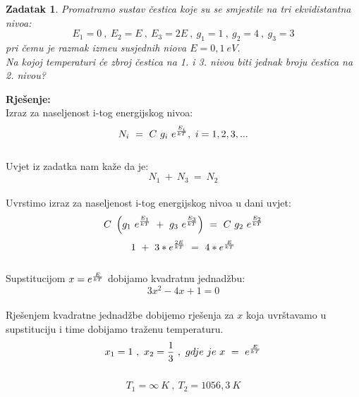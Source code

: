 \documentclass[a4paper,12pt]{article}
\newtheorem{ZDK}{Zadatak}[section]
\begin{document}
\newpage
\begin{ZDK}
	Promatramo sustav \v{c}estica koje su se smjestile na tri ekvidistantna nivoa:
	$$ E_1=0\ ,\ E_2=E\ ,\ E_3=2E\ ,\ g_1=1\ ,\ g_2=4\ ,\ g_3=3 $$
	pri \v{c}emu je razmak izme\dj u susjednih niova $E=0,1\ eV$.
	\\
	Na kojoj temperaturi \'ce zbroj \v{c}estica na 1. i 3. nivou biti jednak broju \v{c}estica na 2. nivou?
\end{ZDK}
\textbf{Rje\v{s}enje:} \\
\newline
Izraz za naseljenost i-tog energijskog nivoa:
$$ N_i\ =\ C\ g_i\ e^{\-\frac{E_i}{kT}},\ i=1,2,3,... $$
\\
Uvjet iz zadatka nam ka\v{z}e da je:
$$ N_1\ +\ N_3\ =\ N_2 $$
\\
Uvrstimo izraz za naseljenost i-tog energijskog nivoa u dani uvjet:
$$ C\ \left( g_1\ e^{\-\frac{E_1}{kT}}\ +\ g_3\ e^{\-\frac{E_3}{kT}}\right)\ =\ C\ g_2\ e^{\-\frac{E_2}{kT}} $$
$$ 1\ +\ 3*e^{\-\frac{2E}{kT}}\ =\ 4*e^{\-\frac{E}{kT}}  $$
\\
Supstitucijom $x=e^{\-\frac{E}{kT}}$ dobijamo kvadratnu jednad\v{z}bu:
$$ 3x^2-4x+1=0 $$
\\
Rje\v{s}enjem kvadratne jednad\v{z}be dobijemo rje\v{s}enja za $x$ koja uvr\v{s}tavamo u supstituciju i time dobijamo tra\v{z}enu temperaturu.
\\
$$ x_1=1\ ,\ x_2=\frac{1}{3}\ ,\ gdje\ je\ x\ =\ e^{\-\frac{E}{kT}} $$
\\
$$ T_1=\infty\ K\ ,\ T_2=1056,3\ K $$
\end{document}
